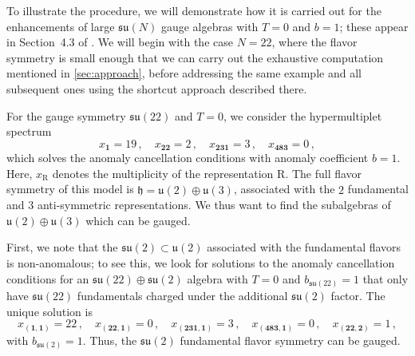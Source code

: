\documentclass[11pt, a4paper]{article}
\newcommand*{\fkh}{\ensuremath{\mathfrak{h}}}
\newcommand*{\fku}{\ensuremath{\mathfrak{u}}}
\newcommand*{\fksu}{\ensuremath{\mathfrak{su}}}
\newcommand*{\birrep}{\ensuremath{\bm{\mathrm{R}}}}
\begin{document}
To illustrate the procedure, we will demonstrate how it is carried out for the enhancements of large $\fksu(N)$ gauge algebras with $T = 0$ and $b = 1$; these appear in Section~4.3 of \cite{Raghuram:2020vxm}. We will begin with the case $N = 22$, where the flavor symmetry is small enough that we can carry out the exhaustive computation mentioned in \cref{sec:approach}, before addressing the same example and all subsequent ones using the shortcut approach described there.

For the gauge symmetry $\fksu(22)$ and $T = 0$, we consider the hypermultiplet spectrum
    \begin{equation}
        \label{eq:spectrum_su22}
        x_{\bm{1}} = 19\,, \quad x_{\bm{22}} = 2\,, \quad x_{\bm{231}} = 3\,, \quad x_{\bm{483}} = 0\,,
    \end{equation}
which solves the anomaly cancellation conditions with anomaly coefficient $b = 1$. Here, $x_{\birrep}$ denotes the multiplicity of the representation $\birrep$. The full flavor symmetry of this model is $\hat{\fkh} = \fku(2) \oplus \fku(3)$, associated with the $2$ fundamental and $3$ anti-symmetric representations. We thus want to find the subalgebras of $\fku(2) \oplus \fku(3)$ which can be gauged.

First, we note that the $\fksu(2) \subset \fku(2)$ associated with the fundamental flavors is non-anomalous; to see this, we look for solutions to the anomaly cancellation conditions  for an $\fksu(22) \oplus \fksu(2)$ algebra with $T = 0$ and $b_{\fksu(22)} = 1$ that only have $\fksu(22)$ fundamentals charged under the additional $\fksu(2)$ factor. The unique solution is
    \begin{equation}
        \label{eq:su22su2fund}
        x_{(\bm{1}, \bm{1})} = 22\,, \quad x_{(\bm{22}, \bm{1})} = 0\,, \quad x_{(\bm{231}, \bm{1})} = 3\,, \quad x_{(\bm{483}, \bm{1})} = 0\,, \quad x_{(\bm{22}, \bm{2})} = 1\,,
    \end{equation}
with $b_{\fksu(2)} = 1$. Thus, the $\fksu(2)$ fundamental flavor symmetry can be gauged.
\end{document}

